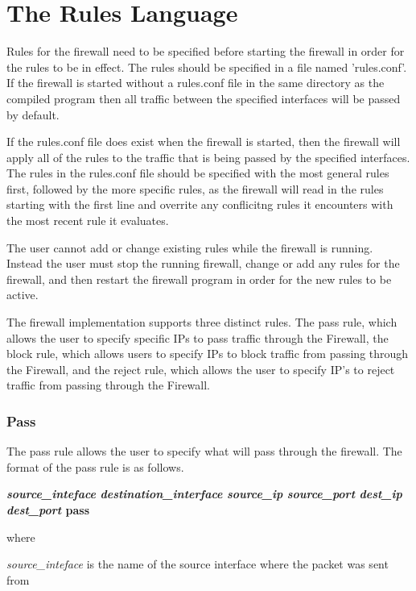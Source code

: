 \documentclass[12pt]{article} %
\begin{document}
\section{The Rules Language} %
Rules for the firewall need to be specified before starting the firewall in order for the rules to
be in effect. The rules should be 
specified in a file named 'rules.conf'. If the firewall is started without a rules.conf file
in the same directory as the compiled program then all traffic between the specified interfaces
will be passed by default. 


If the rules.conf file does exist when the firewall is started, then
the firewall will apply all of the rules to the traffic that is being passed by the specified
interfaces. The rules in the rules.conf file should be specified with the most general rules first, followed 
by the more specific rules, as the firewall will read in the rules starting with the first line 
and overrite any conflicitng rules it encounters with the most recent rule it evaluates.


The user cannot add or change existing rules while the firewall is running. Instead the user must
stop the running firewall, change or add any rules for the firewall, and then restart the firewall
program in order for the new rules to be active.


The firewall implementation supports three distinct rules. The pass rule, which allows the user
to specify specific IPs to pass traffic through the Firewall, the block rule, which allows users
to specify IPs to block traffic from passing through the Firewall, and the reject rule, which 
allows the user to specify IP's to reject traffic from passing through the Firewall.   


\subsubsection{Pass} %
The pass rule allows the user to specify what will pass through the firewall. The format of the 
pass rule is as follows. 

\vspace{1pc}
\textbf{\emph{source\_inteface} \emph{destination\_interface} \emph{source\_ip} \emph{source\_port} \emph{dest\_ip} \emph{dest\_port} pass}
\vspace{1pc}

where

\emph{source\_inteface} is the name of the source interface where the packet was sent from
\end{document}
